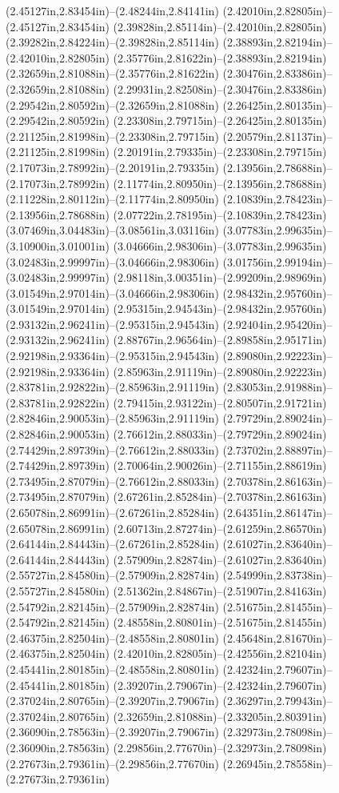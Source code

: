 (2.45127in,2.83454in)--(2.48244in,2.84141in) (2.42010in,2.82805in)--(2.45127in,2.83454in) (2.39828in,2.85114in)--(2.42010in,2.82805in) (2.39282in,2.84224in)--(2.39828in,2.85114in) (2.38893in,2.82194in)--(2.42010in,2.82805in) (2.35776in,2.81622in)--(2.38893in,2.82194in) (2.32659in,2.81088in)--(2.35776in,2.81622in) (2.30476in,2.83386in)--(2.32659in,2.81088in) (2.29931in,2.82508in)--(2.30476in,2.83386in) (2.29542in,2.80592in)--(2.32659in,2.81088in) (2.26425in,2.80135in)--(2.29542in,2.80592in) (2.23308in,2.79715in)--(2.26425in,2.80135in) (2.21125in,2.81998in)--(2.23308in,2.79715in) (2.20579in,2.81137in)--(2.21125in,2.81998in) (2.20191in,2.79335in)--(2.23308in,2.79715in) (2.17073in,2.78992in)--(2.20191in,2.79335in) (2.13956in,2.78688in)--(2.17073in,2.78992in) (2.11774in,2.80950in)--(2.13956in,2.78688in) (2.11228in,2.80112in)--(2.11774in,2.80950in) (2.10839in,2.78423in)--(2.13956in,2.78688in) (2.07722in,2.78195in)--(2.10839in,2.78423in) (3.07469in,3.04483in)--(3.08561in,3.03116in) (3.07783in,2.99635in)--(3.10900in,3.01001in) (3.04666in,2.98306in)--(3.07783in,2.99635in) (3.02483in,2.99997in)--(3.04666in,2.98306in) (3.01756in,2.99194in)--(3.02483in,2.99997in) (2.98118in,3.00351in)--(2.99209in,2.98969in) (3.01549in,2.97014in)--(3.04666in,2.98306in) (2.98432in,2.95760in)--(3.01549in,2.97014in) (2.95315in,2.94543in)--(2.98432in,2.95760in) (2.93132in,2.96241in)--(2.95315in,2.94543in) (2.92404in,2.95420in)--(2.93132in,2.96241in) (2.88767in,2.96564in)--(2.89858in,2.95171in) (2.92198in,2.93364in)--(2.95315in,2.94543in) (2.89080in,2.92223in)--(2.92198in,2.93364in) (2.85963in,2.91119in)--(2.89080in,2.92223in) (2.83781in,2.92822in)--(2.85963in,2.91119in) (2.83053in,2.91988in)--(2.83781in,2.92822in) (2.79415in,2.93122in)--(2.80507in,2.91721in) (2.82846in,2.90053in)--(2.85963in,2.91119in) (2.79729in,2.89024in)--(2.82846in,2.90053in) (2.76612in,2.88033in)--(2.79729in,2.89024in) (2.74429in,2.89739in)--(2.76612in,2.88033in) (2.73702in,2.88897in)--(2.74429in,2.89739in) (2.70064in,2.90026in)--(2.71155in,2.88619in) (2.73495in,2.87079in)--(2.76612in,2.88033in) (2.70378in,2.86163in)--(2.73495in,2.87079in) (2.67261in,2.85284in)--(2.70378in,2.86163in) (2.65078in,2.86991in)--(2.67261in,2.85284in) (2.64351in,2.86147in)--(2.65078in,2.86991in) (2.60713in,2.87274in)--(2.61259in,2.86570in) (2.64144in,2.84443in)--(2.67261in,2.85284in) (2.61027in,2.83640in)--(2.64144in,2.84443in) (2.57909in,2.82874in)--(2.61027in,2.83640in) (2.55727in,2.84580in)--(2.57909in,2.82874in) (2.54999in,2.83738in)--(2.55727in,2.84580in) (2.51362in,2.84867in)--(2.51907in,2.84163in) (2.54792in,2.82145in)--(2.57909in,2.82874in) (2.51675in,2.81455in)--(2.54792in,2.82145in) (2.48558in,2.80801in)--(2.51675in,2.81455in) (2.46375in,2.82504in)--(2.48558in,2.80801in) (2.45648in,2.81670in)--(2.46375in,2.82504in) (2.42010in,2.82805in)--(2.42556in,2.82104in) (2.45441in,2.80185in)--(2.48558in,2.80801in) (2.42324in,2.79607in)--(2.45441in,2.80185in) (2.39207in,2.79067in)--(2.42324in,2.79607in) (2.37024in,2.80765in)--(2.39207in,2.79067in) (2.36297in,2.79943in)--(2.37024in,2.80765in) (2.32659in,2.81088in)--(2.33205in,2.80391in) (2.36090in,2.78563in)--(2.39207in,2.79067in) (2.32973in,2.78098in)--(2.36090in,2.78563in) (2.29856in,2.77670in)--(2.32973in,2.78098in) (2.27673in,2.79361in)--(2.29856in,2.77670in) (2.26945in,2.78558in)--(2.27673in,2.79361in) 